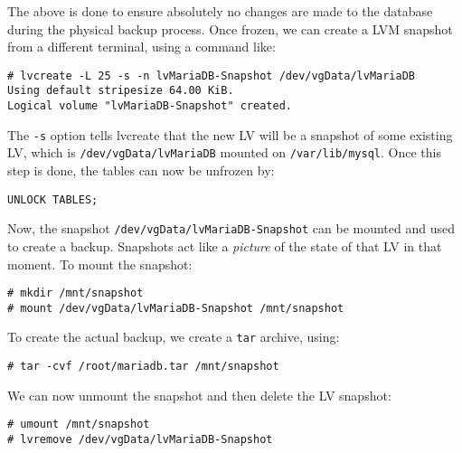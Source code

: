 \noindent
The above is done to ensure absolutely no changes are made to the database during the physical backup process. Once frozen, we can create a LVM snapshot from a different terminal, using a command like:

\vspace{-15pt}
\begin{verbatim}
# lvcreate -L 25 -s -n lvMariaDB-Snapshot /dev/vgData/lvMariaDB
Using default stripesize 64.00 KiB.
Logical volume "lvMariaDB-Snapshot" created.
\end{verbatim}
\vspace{-10pt}	

\noindent
The \verb|-s| option tells lvcreate that the new LV will be a snapshot of some existing LV, which is \verb|/dev/vgData/lvMariaDB| mounted on \verb|/var/lib/mysql|. Once this step is done, the tables can now be unfrozen by:

\vspace{-15pt}
\begin{verbatim}
UNLOCK TABLES;
\end{verbatim}
\vspace{-10pt}	

\noindent
Now, the snapshot \verb|/dev/vgData/lvMariaDB-Snapshot| can be mounted and used to create a backup. Snapshots act like a \textit{picture} of the state of that LV in that moment. To mount the snapshot:

\vspace{-15pt}
\begin{verbatim}
# mkdir /mnt/snapshot
# mount /dev/vgData/lvMariaDB-Snapshot /mnt/snapshot
\end{verbatim}
\vspace{-10pt}	

\noindent
To create the actual backup, we create a \verb|tar| archive, using:

\vspace{-15pt}
\begin{verbatim}
# tar -cvf /root/mariadb.tar /mnt/snapshot
\end{verbatim}
\vspace{-10pt}	

\noindent
We can now unmount the snapshot and then delete the LV snapshot:

\vspace{-15pt}
\begin{verbatim}
# umount /mnt/snapshot
# lvremove /dev/vgData/lvMariaDB-Snapshot
\end{verbatim}
\vspace{-10pt}	

